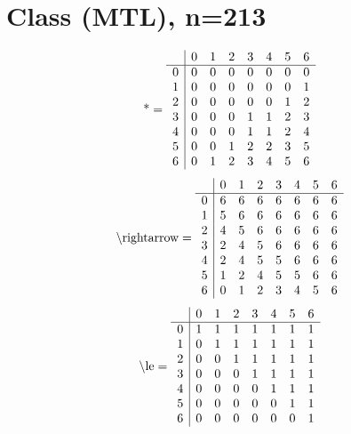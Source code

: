 \documentclass[11pt]{article}
\begin{document}
\section{Class (MTL), n=213}
\[\text{*} = 
\begin{array}{r | r r r r r r r}
 & 0 & 1 & 2 & 3 & 4 & 5 & 6 \\ \hline
0 & 0 & 0 & 0 & 0 & 0 & 0 & 0 \\
1 & 0 & 0 & 0 & 0 & 0 & 0 & 1 \\
2 & 0 & 0 & 0 & 0 & 0 & 1 & 2 \\
3 & 0 & 0 & 0 & 1 & 1 & 2 & 3 \\
4 & 0 & 0 & 0 & 1 & 1 & 2 & 4 \\
5 & 0 & 0 & 1 & 2 & 2 & 3 & 5 \\
6 & 0 & 1 & 2 & 3 & 4 & 5 & 6 \\
\end{array}
\]
\[\text{\textbackslash rightarrow} = 
\begin{array}{r | r r r r r r r}
 & 0 & 1 & 2 & 3 & 4 & 5 & 6 \\ \hline
0 & 6 & 6 & 6 & 6 & 6 & 6 & 6 \\
1 & 5 & 6 & 6 & 6 & 6 & 6 & 6 \\
2 & 4 & 5 & 6 & 6 & 6 & 6 & 6 \\
3 & 2 & 4 & 5 & 6 & 6 & 6 & 6 \\
4 & 2 & 4 & 5 & 5 & 6 & 6 & 6 \\
5 & 1 & 2 & 4 & 5 & 5 & 6 & 6 \\
6 & 0 & 1 & 2 & 3 & 4 & 5 & 6 \\
\end{array}
\]
\[\text{\textbackslash le} = 
\begin{array}{r | r r r r r r r}
 & 0 & 1 & 2 & 3 & 4 & 5 & 6 \\ \hline
0 & 1 & 1 & 1 & 1 & 1 & 1 & 1 \\
1 & 0 & 1 & 1 & 1 & 1 & 1 & 1 \\
2 & 0 & 0 & 1 & 1 & 1 & 1 & 1 \\
3 & 0 & 0 & 0 & 1 & 1 & 1 & 1 \\
4 & 0 & 0 & 0 & 0 & 1 & 1 & 1 \\
5 & 0 & 0 & 0 & 0 & 0 & 1 & 1 \\
6 & 0 & 0 & 0 & 0 & 0 & 0 & 1 \\
\end{array}
\]
\end{document}
